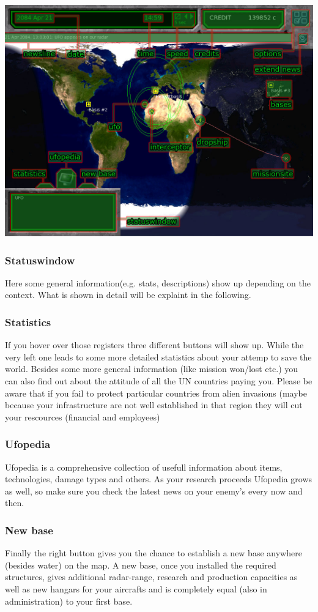 \includegraphics[width=\textwidth]{images/geoscape_final.jpg}

\newpage

\subsubsection{Statuswindow}
Here some general information(e.g. stats, descriptions) show up depending on the context. What is shown in detail will be explaint in the following.
\subsubsection{Statistics}
If you hover over those registers three different buttons will show up. While the very left one leads to some more detailed statistics about your attemp to save the world. Besides some more general information (like mission won/lost etc.) you can also find out about the attitude of all the UN countries paying you. Please be aware that if you fail to protect particular countries from alien invasions (maybe because your infrastructure are not well established in that region they will cut your rescources (financial and employees)
\subsubsection{Ufopedia}
Ufopedia is a comprehensive collection of usefull information about items, technologies, damage types and others. As your research proceeds Ufopedia grows as well, so make sure you check the latest news on your enemy's every now and then.
\subsubsection{New base}
Finally the right button gives you the chance to establish a new base anywhere (besides water) on the map. A new base, once you installed the required structures, gives additional radar-range, research and production capacities as well as new hangars for your aircrafts and is completely equal (also in administration) to your first base.
